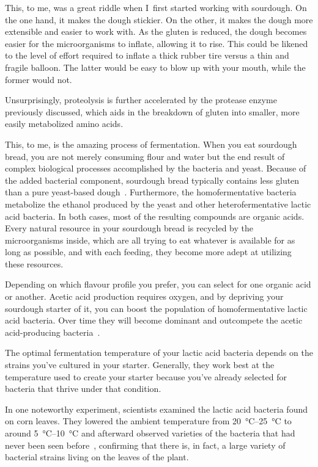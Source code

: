 This, to me, was a great riddle when I~first started working with sourdough.
On the one hand, it makes the dough stickier. On the other, it makes the dough
more extensible and easier to work with. As the gluten is reduced, the dough
becomes easier for the microorganisms to inflate, allowing it to rise. This
could be likened to the level of effort required to inflate a thick rubber tire
versus a thin and fragile balloon. The latter would be easy to blow up with
your mouth, while the former would not.

Unsurprisingly, proteolysis is further accelerated by the protease enzyme
previously discussed, which aids in the breakdown of gluten into smaller,
more easily metabolized amino acids.

This, to me, is the amazing process of fermentation. When you eat sourdough
bread, you are not merely consuming flour and water but the end result of
complex biological processes accomplished by the bacteria and yeast. Because
of the added bacterial component, sourdough bread typically contains less
gluten than a pure yeast-based dough~\cite{proteolysis+sourdough+bacteria}.
Furthermore, the homofermentative bacteria metabolize the ethanol produced by
the yeast and other heterofermentative lactic acid bacteria. In both cases,
most of the resulting compounds are organic acids. Every natural resource in
your sourdough bread is recycled by the microorganisms inside, which are all
trying to eat whatever is available for as long as possible, and with each
feeding, they become more adept at utilizing these resources.

Depending on which flavour profile you prefer, you can select for one organic
acid or another. Acetic acid production requires oxygen, and by depriving
your sourdough starter of it, you can boost the population of homofermentative
lactic acid bacteria. Over time they will become dominant and outcompete the
acetic acid-producing bacteria~\cite{acetic+acid+oxygen}.

The optimal fermentation temperature of your lactic acid bacteria depends on
the strains you've cultured in your starter. Generally, they work best at the
temperature used to create your starter because you've already selected for
bacteria that thrive under that condition.

In one noteworthy experiment, scientists examined the lactic acid bacteria
found on corn leaves. They lowered the ambient temperature from \qtyrange{20}{25}{\degreeCelsius} to around
\qtyrange{5}{10}{\degreeCelsius} and afterward observed varieties of the bacteria that had never been
seen before~\cite{temperature+bacteria+corn}, confirming that there is, in
fact, a large variety of bacterial strains living on the leaves of the plant.

